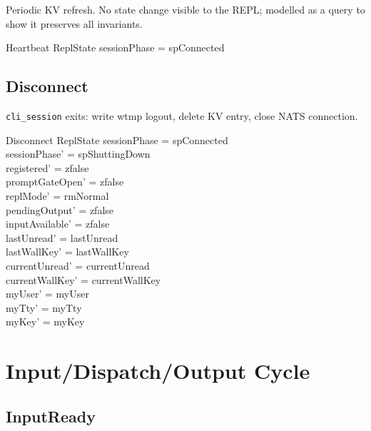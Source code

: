 \documentclass[a4paper,10pt,fleqn]{article}
\begin{document}
Periodic KV refresh.  No state change visible to the REPL; modelled
as a query to show it preserves all invariants.

\begin{schema}{Heartbeat}
  \Xi ReplState
\where
  sessionPhase = spConnected
\end{schema}

\subsection{Disconnect}

\texttt{cli\_session} exits: write wtmp logout, delete KV entry,
close NATS connection.

\begin{schema}{Disconnect}
  \Delta ReplState
\where
  sessionPhase = spConnected \\
  sessionPhase' = spShuttingDown \\
  registered' = zfalse \\
  promptGateOpen' = zfalse \\
  replMode' = rmNormal \\
  pendingOutput' = zfalse \\
  inputAvailable' = zfalse \\
  lastUnread' = lastUnread \\
  lastWallKey' = lastWallKey \\
  currentUnread' = currentUnread \\
  currentWallKey' = currentWallKey \\
  myUser' = myUser \\
  myTty' = myTty \\
  myKey' = myKey
\end{schema}

\section{Input/Dispatch/Output Cycle}

\subsection{InputReady}
\end{document}
